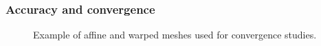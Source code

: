 \documentclass[preprint,10pt]{article}
\theoremstyle{definition}
\theoremstyle{lemma}
\theoremstyle{theorem}
\theoremstyle{assumption}
\begin{document}
{\subsubsection{Accuracy and convergence}

\begin{figure}
\centering
{}
\hspace{2em}
\caption{Example of affine and warped meshes used for convergence studies.}
\label{fig:warp2dconverge}
\end{figure}

}
\end{document}
